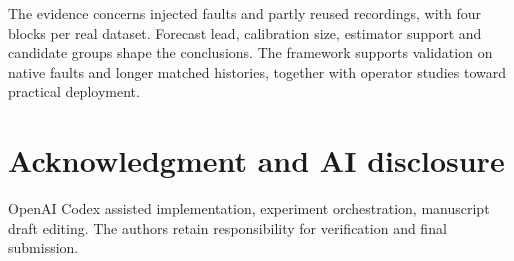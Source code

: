 \documentclass[conference]{IEEEtran}
\begin{document}
The evidence concerns injected faults and partly reused recordings, with
four blocks per real dataset. Forecast lead, calibration size, estimator
support and candidate groups shape the conclusions. The framework supports
validation on native faults and longer matched histories, together with
operator studies toward practical deployment.






\section*{Acknowledgment and AI disclosure}
OpenAI Codex assisted implementation, experiment orchestration, manuscript draft
editing. The authors retain responsibility
for verification and final submission. 






\end{document}
